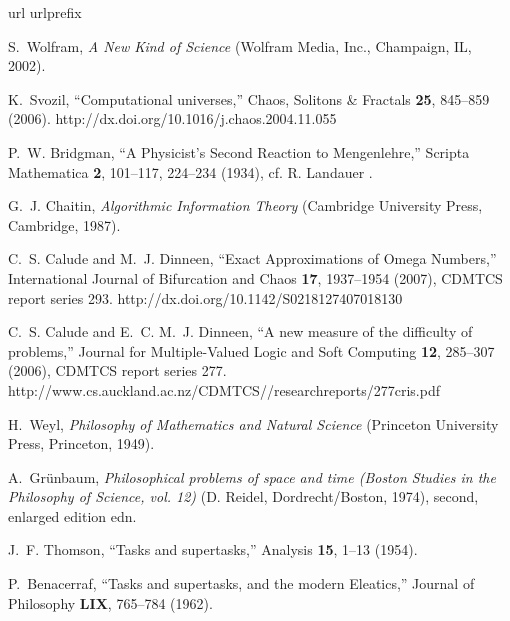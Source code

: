 \documentclass[12pt]{article}
\begin{document}
%
%



\begin{thebibliography}{10}
\newcommand{\enquote}[1]{``#1''}
\expandafter\ifx\csname url\endcsname\relax
  \def\url#1{{#1}}\fi
\expandafter\ifx\csname urlprefix\endcsname\relax\def\urlprefix{}\fi

S.~Wolfram, {\em A New Kind of Science\/} (Wolfram Media, Inc., Champaign, IL,
  2002).

K.~Svozil, \enquote{Computational universes,} Chaos, Solitons \& Fractals {\bf
  25}, 845--859 (2006).
\newline http://dx.doi.org/10.1016/j.chaos.2004.11.055

P.~W. Bridgman, \enquote{A Physicist's Second Reaction to {M}engenlehre,}
  Scripta Mathematica {\bf 2}, 101--117, 224--234 (1934), cf. R. Landauer
  \cite{landauer-95}.

G.~J. Chaitin, {\em Algorithmic Information Theory\/} (Cambridge University
  Press, Cambridge, 1987).

C.~S. Calude and M.~J. Dinneen, \enquote{Exact Approximations of Omega
  Numbers,} International Journal of Bifurcation and Chaos {\bf 17}, 1937--1954
  (2007), {CDMTCS} report series 293.
\newline http://dx.doi.org/10.1142/S0218127407018130

C.~S. Calude and E.~C. M.~J. Dinneen, \enquote{A new measure of the difficulty
  of problems,} Journal for Multiple-Valued Logic and Soft Computing {\bf 12},
  285--307 (2006), {CDMTCS} report series 277.
\newline http://www.cs.auckland.ac.nz/CDMTCS//researchreports/277cris.pdf

H.~Weyl, {\em Philosophy of Mathematics and Natural Science\/} (Princeton
  University Press, Princeton, 1949).

A.~Gr{\"{u}}nbaum, {\em Philosophical problems of space and time (Boston
  Studies in the Philosophy of Science, vol. 12)\/} (D. Reidel,
  Dordrecht/Boston, 1974), second, enlarged edition edn.

J.~F. Thomson, \enquote{Tasks and supertasks,} Analysis {\bf 15}, 1--13 (1954).

P.~Benacerraf, \enquote{Tasks and supertasks, and the modern {E}leatics,}
  Journal of Philosophy {\bf LIX}, 765--784 (1962).


\end{thebibliography}
\end{document}

